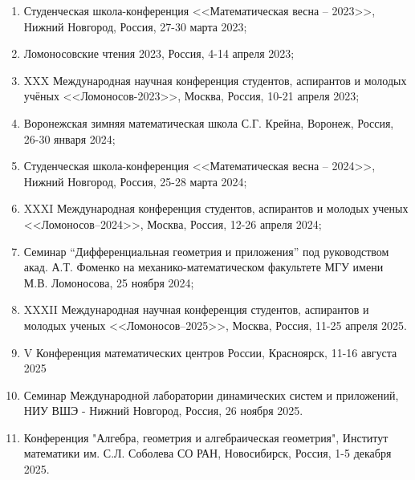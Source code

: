 \begin{enumerate}%
\item Студенческая школа-конференция <<Математическая весна --  2023>>, Нижний Новгород, Россия, 27-30 марта 2023;

\item Ломоносовские чтения 2023, Россия, 4-14 апреля 2023;

\item XXX Международная научная конференция студентов, аспирантов и молодых учёных <<Ломоносов-2023>>,  Москва, Россия, 10-21 апреля 2023;

\item Воронежская зимняя математическая школа С.Г. Крейна, Воронеж, Россия, 26-30 января 2024;

\item Студенческая школа-конференция <<Математическая весна -- 2024>>, Нижний Новгород, Россия, 25-28 марта 2024;

\item XXXI Международная конференция студентов, аспирантов и молодых ученых <<Ломоносов--2024>>, Москва, Россия, 12-26 апреля 2024;

\item Семинар “Дифференциальная геометрия и приложения” под руководством акад. А.Т. Фоменко на механико-математическом факультете МГУ имени М.В. Ломоносова, 25 ноября 2024;


\item XXXII Международная научная конференция студентов, аспирантов и молодых ученых <<Ломоносов--2025>>, Москва, Россия, 11-25 апреля 2025.

\item V Конференция математических центров России, Красноярск, 11-16 августа 2025

\item Семинар Международной лаборатории динамических систем и приложений, НИУ ВШЭ - Нижний Новгород, Россия, 26 ноября 2025.

\item Конференция "Алгебра, геометрия и алгебраическая геометрия", Институт математики им. С.Л. Соболева СО РАН, Новосибирск, Россия, 1-5 декабря 2025.
\end{enumerate}



